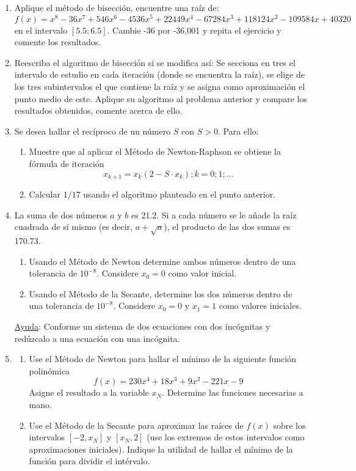\documentclass[12pt,letterpaper]{article}
\begin{document}
\begin{enumerate}

\item Aplique el m\'etodo de bisecci\'on, encuentre una ra\'iz de:
$$
f(x) = x^8 - 36x^7 + 546x^6 - 4536x^5 + 22449x^4 - 67284x^3 + 118124x^
2 - 109584x + 40320
$$
en el intervalo $[5.5; 6.5]$. Cambie -36 por -36,001 y repita el ejercicio y comente los resultados.

\item Reescriba el algoritmo de bisecci\'on si se modifica as\'i: Se secciona en tres el intervalo de estudio en cada
iteraci\'on (donde se encuentra la ra\'iz), se elige de los tres subintervalos el que contiene la ra\'iz y se asigna
como aproximaci\'on el punto medio de este. Aplique su algoritmo al problema anterior y compare los
resultados obtenidos, comente acerca de ello.

\item Se desea hallar el rec\'iproco de un n\'umero $S$ con $S>0$. Para ello:
\begin{enumerate}
  \item Muestre que al aplicar el M\'etodo de Newton-Raphson se obtiene la f\'ormula de iteraci\'on
  $$
  x_{k+1} = x_k(2 - S\cdot x_k); k = 0; 1; \ldots
  $$
  \item Calcular $1/17$ usando el algoritmo planteado en el punto anterior.
\end{enumerate}

\item La suma de dos n\'umeros $a$ y $b$ es 21.2. Si a cada n\'umero se le a\~nade la ra\'iz cuadrada de s\'i mismo (es
decir, $a + \sqrt{a}$), el producto de las dos sumas es 170.73.
\begin{enumerate}
  \item Usando el M\'etodo de Newton determine ambos n\'umeros dentro de una tolerancia de $10^{-8}$. Considere $x_0 = 0$ como valor inicial.
  \item Usando el M\'etodo de la Secante, determine los dos n\'umeros dentro de una tolerancia de $10^{-8}$. Considere $x_0 = 0$ y $x_1 = 1$ como valores iniciales.
\end{enumerate}
\underline{Ayuda}: Conforme un sistema de dos ecuaciones con dos inc\'ognitas y red\'uzcalo a una ecuaci\'on con una inc\'ognita.

\item \begin{enumerate}
    \item Use el M\'etodo de Newton para hallar el m\'inimo de la siguiente funci\'on polin\'omica
    $$
    f(x) = 230x^4 + 18x^3 + 9x^2 - 221x - 9
    $$    
    Asigne el resultado a la variable $x_N$. Determine las funciones necesarias a mano.
    \item Use el M\'etodo de la Secante para aproximar las ra\'ices de $f(x)$ sobre los intervalos $[-2, x_N]$ y
    $[x_N, 2]$ (use los extremos de estos intervalos como aproximaciones iniciales). Indique la utilidad de
    hallar el m\'inimo de la funci\'on para dividir el int\'ervalo.
\end{enumerate}


\end{enumerate}
\end{document}
